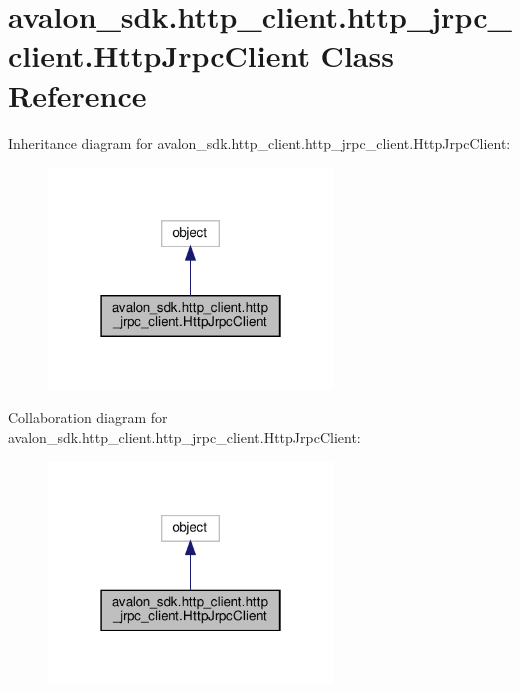 \hypertarget{classavalon__sdk_1_1http__client_1_1http__jrpc__client_1_1HttpJrpcClient}{}\section{avalon\+\_\+sdk.\+http\+\_\+client.\+http\+\_\+jrpc\+\_\+client.\+Http\+Jrpc\+Client Class Reference}
\label{classavalon__sdk_1_1http__client_1_1http__jrpc__client_1_1HttpJrpcClient}


Inheritance diagram for avalon\+\_\+sdk.\+http\+\_\+client.\+http\+\_\+jrpc\+\_\+client.\+Http\+Jrpc\+Client\+:
\nopagebreak
\begin{figure}[H]
\begin{center}
\leavevmode
\includegraphics[width=214pt]{classavalon__sdk_1_1http__client_1_1http__jrpc__client_1_1HttpJrpcClient__inherit__graph}
\end{center}
\end{figure}


Collaboration diagram for avalon\+\_\+sdk.\+http\+\_\+client.\+http\+\_\+jrpc\+\_\+client.\+Http\+Jrpc\+Client\+:
\nopagebreak
\begin{figure}[H]
\begin{center}
\leavevmode
\includegraphics[width=214pt]{classavalon__sdk_1_1http__client_1_1http__jrpc__client_1_1HttpJrpcClient__coll__graph}
\end{center}
\end{figure}
